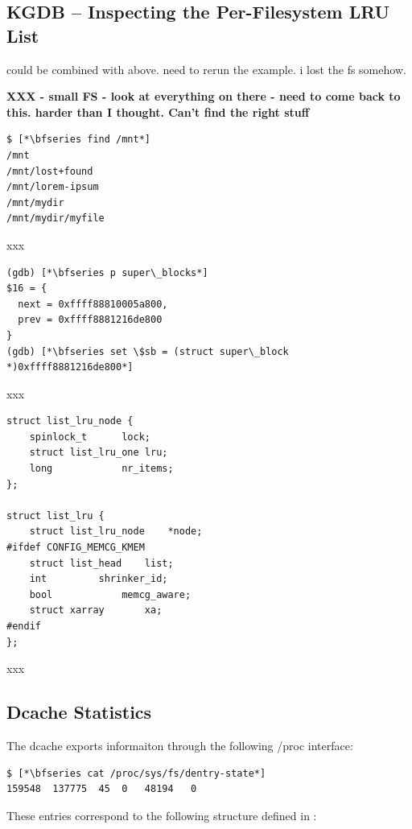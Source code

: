 \subsection{KGDB -- Inspecting the Per-Filesystem LRU List}

could be combined with above. need to rerun the example. i lost the fs somehow.

\textbf{XXX - small FS - look at everything on there - need to come back to this. harder than I thought. Can't find the right stuff}

\begin{lstlisting}
$ [*\bfseries find /mnt*]
/mnt
/mnt/lost+found
/mnt/lorem-ipsum
/mnt/mydir
/mnt/mydir/myfile
\end{lstlisting}

\noindent
xxx

\begin{lstlisting}
(gdb) [*\bfseries p super\_blocks*]
$16 = {
  next = 0xffff88810005a800,
  prev = 0xffff8881216de800
}
(gdb) [*\bfseries set \$sb = (struct super\_block *)0xffff8881216de800*]
\end{lstlisting}

\noindent
xxx

\begin{lstlisting}
struct list_lru_node {
    spinlock_t      lock;
    struct list_lru_one lru;
    long            nr_items;
};

struct list_lru {
    struct list_lru_node    *node;
#ifdef CONFIG_MEMCG_KMEM
    struct list_head    list;
    int         shrinker_id;
    bool            memcg_aware;
    struct xarray       xa;
#endif
};
\end{lstlisting}

\noindent
xxx


\subsection{Dcache Statistics}

The dcache exports informaiton through the following /proc interface:

\begin{lstlisting}
$ [*\bfseries cat /proc/sys/fs/dentry-state*]
159548	137775	45	0	48194	0
\end{lstlisting}

\noindent
These entries correspond to the following structure defined in :

